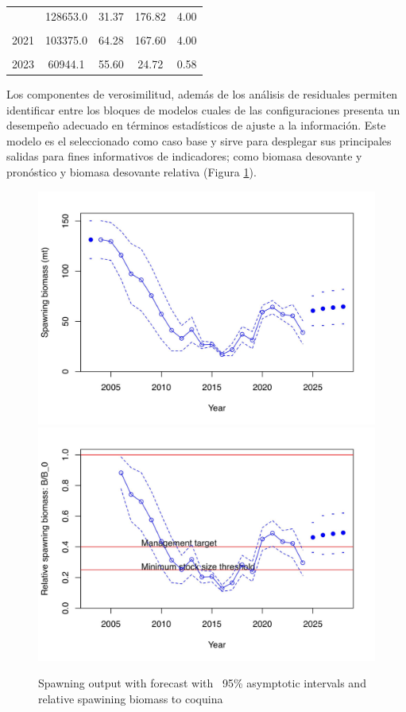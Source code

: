 \documentclass[
]{article}
\begin{document}
\begin{table}[ht!]
\begin{tabular}[t]{ccccc}
\addlinespace
2019 & 128653.0 & 31.37 & 176.82 & 4.00\\
\cellcolor{gray!10}{2020} & \cellcolor{gray!10}{111082.0} & \cellcolor{gray!10}{59.33} & \cellcolor{gray!10}{191.15} & \cellcolor{gray!10}{4.00}\\
2021 & 103375.0 & 64.28 & 167.60 & 4.00\\
\cellcolor{gray!10}{2022} & \cellcolor{gray!10}{46126.8} & \cellcolor{gray!10}{56.98} & \cellcolor{gray!10}{135.34} & \cellcolor{gray!10}{2.91}\\
2023 & 60944.1 & 55.60 & 24.72 & 0.58\\
\bottomrule
\end{tabular}
\end{table}

Los componentes de verosimilitud, además de los análisis de residuales permiten identificar entre los bloques de modelos cuales de las configuraciones presenta un desempeño adecuado en términos estadísticos de ajuste a la información. Este modelo es el seleccionado como caso base y sirve para desplegar sus principales salidas para fines informativos de indicadores; como biomasa desovante y pronóstico y biomasa desovante relativa (Figura \ref{fig:ssb}).

\begin{figure}[H]

{\centering \includegraphics[width=0.8\linewidth]{Dtrunculus_SS3_2024_files/figure-latex/ssb-1} \includegraphics[width=0.8\linewidth]{Dtrunculus_SS3_2024_files/figure-latex/ssb-2} 

}

\caption{\label{fig:ssb}Spawning output with forecast with ~95\% asymptotic intervals and relative spawining biomass to coquina}\label{fig:ssb}
\end{figure}
\end{document}
